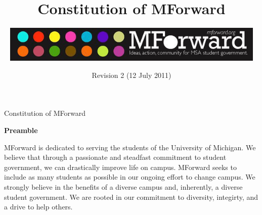 \documentclass{constitution}
\begin{document}
	\renewcommand{\thepage}{\roman{page}}
	\title{Constitution of MForward}
	\author{\includegraphics[width=5in]{MForwardLogo.jpg}}
	\date{Revision 2 (12 July 2011)}
	\maketitle
	\tableofcontents
	\newpage

	\renewcommand{\thepage}{\arabic{page}}
	\setcounter{page}{1}
	\pagestyle{fancy}
	\headheight 35pt
	\linenumbers
	
	\begin{center}
		\Large Constitution of MForward
	\end{center}
	
	\begin{center}
		\bfseries Preamble
	\end{center}

MForward is dedicated to serving the students of the University of Michigan. We believe that through a passionate and steadfast commitment to student government, we can drastically improve life on campus. MForward seeks to include as many students as possible in our ongoing effort to change campus. We strongly believe in the benefits of a diverse campus and, inherently, a diverse student government. We are rooted in our commitment to diversity, integirty, and a drive to help others.


	
\end{document}
